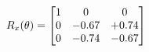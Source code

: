 \documentclass[preview]{standalone}
\begin{document}
\begin{align*}
\special{dvisvgm:raw <g id='unique000'>}R_{x}(\theta) = \begin{bmatrix}1 & 0 & 0 \\0 & -0.67 & +0.74 \\0 & -0.74 & -0.67\end{bmatrix}\special{dvisvgm:raw </g>}
\end{align*}
\end{document}
